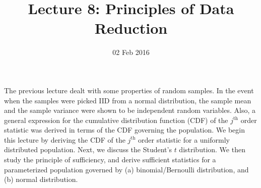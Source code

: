 \documentclass[a4paper,english,12pt]{article}
\title{Lecture 8: Principles of Data Reduction}
\date{02 Feb 2016}
\author{}
\begin{document}
\maketitle
The previous lecture dealt with some properties of random samples. In the event when the samples were picked IID from a normal distribution, the sample mean and the sample variance were shown to be independent random variables. Also, a general expression for the cumulative distribution function (CDF) of the $ j^{\text{th}} $ order statistic was derived in terms of the CDF governing the population. We begin this lecture by deriving the CDF of the $ j^{\text{th}} $ order statistic for a uniformly distributed population. Next, we discuss the Student's $ t $ distribution. We then study the principle of sufficiency, and derive sufficient statistics for a parameterized population governed by (a) binomial/Bernoulli distribution, and (b) normal distribution. 
\end{document}
